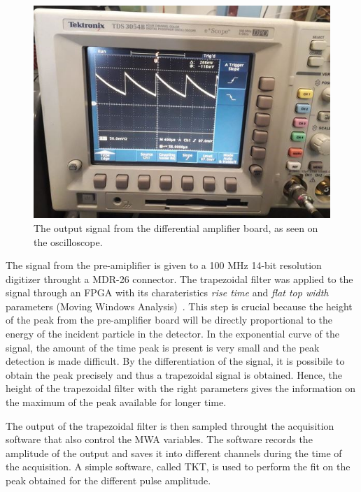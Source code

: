 \begin{figure}[h]
  \centering
  \includegraphics[scale=.35]{img/test_signal_oscilloscope.JPG}
  \caption{The output signal from the differential amplifier board, as seen on the oscilloscope.}
  \label{osc}
\end{figure}

\bigbreak

The signal from the pre-amiplifier is given to a 100 MHz 14-bit resolution digitizer throught a MDR-26 connector.
The trapezoidal filter was applied to the signal through an FPGA with its charateristics \emph{rise time} and \emph{flat top width} parameters (Moving Windows Analysis)~\cite{salathe}. This step is crucial because the height of the peak from the pre-amplifier board will be directly proportional to the energy of the incident particle in the detector. In the exponential curve of the signal, the amount of the time peak is present is very small and the peak detection is made difficult. By the differentiation of the signal, it is possibile to obtain the peak precisely and thus a trapezoidal signal is obtained. 
Hence, the height of the trapezoidal filter with the right parameters gives the information on the maximum of the peak available for longer time.

\bigbreak

The output of the trapezoidal filter is then sampled throught the acquisition software that also control the MWA variables. The software records the amplitude of the output and saves it into different channels during the time of the acquisition. A simple software, called TKT, is used to perform the fit on the peak obtained for the different pulse amplitude. 

